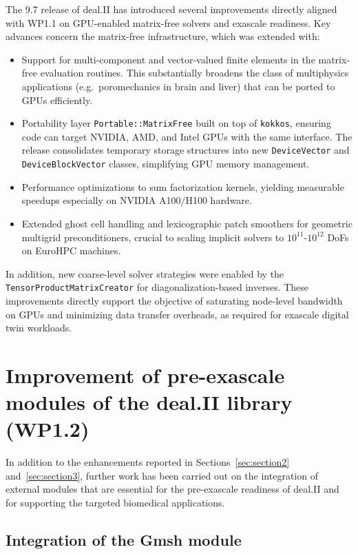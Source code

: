\documentclass[a4paper,12pt]{article}
\begin{document}
The 9.7 release of deal.II has introduced several improvements directly aligned
with WP1.1 on GPU-enabled matrix-free solvers and exascale readiness.  
Key advances concern the matrix-free infrastructure, which was extended with:


\begin{itemize}
  \item Support for multi-component and vector-valued finite elements in the
        matrix-free evaluation routines. This substantially broadens the class
        of multiphysics applications (e.g.\ poromechanics in brain and liver)
        that can be ported to GPUs efficiently.
  \item Portability layer \texttt{Portable::MatrixFree} built on top of
        \texttt{kokkos}, ensuring code can target NVIDIA, AMD, and Intel GPUs with the
        same interface. The release consolidates temporary storage structures
        into new \texttt{DeviceVector} and \texttt{DeviceBlockVector} classes,
        simplifying GPU memory management.
  \item Performance optimizations to sum factorization kernels, yielding
        measurable speedups especially on NVIDIA A100/H100 hardware.
  \item Extended ghost cell handling and lexicographic patch smoothers for
        geometric multigrid preconditioners, crucial to scaling implicit solvers
        to $10^{11}$-$10^{12}$ DoFs on EuroHPC machines.
\end{itemize}

In addition, new coarse-level solver strategies were enabled by the\\
\texttt{TensorProductMatrixCreator} for diagonalization-based inverses.  
These improvements directly support the objective of saturating node-level
bandwidth on GPUs and minimizing data transfer overheads, as required for
exascale digital twin workloads.


\section{Improvement of pre-exascale modules of the deal.II library (WP1.2)}

In addition to the enhancements reported in Sections~\ref{sec:section2} and~\ref{sec:section3},
further work has been carried out on the integration of external modules that are
essential for the pre-exascale readiness of deal.II and for supporting the
targeted biomedical applications.

\subsection{Integration of the Gmsh module}
\end{document}
